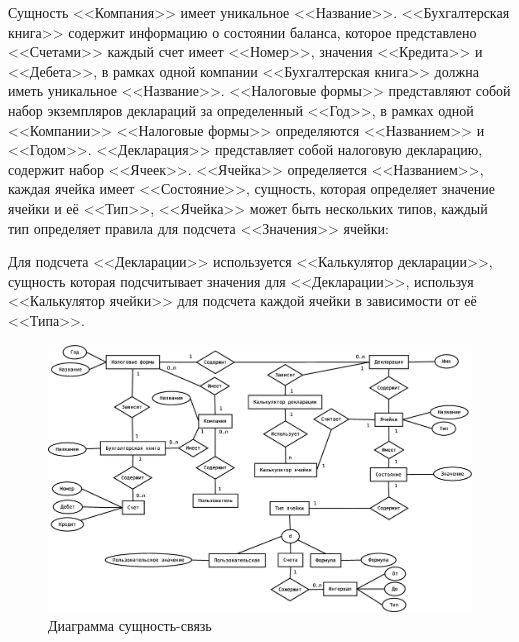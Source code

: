 \documentclass[14pt,a4paper]{reportmod}
\begin{document}
Сущность <<Компания>> имеет уникальное <<Название>>. <<Бухгалтерская книга>> содержит информацию о состоянии баланса, которое представлено <<Счетами>> каждый счет имеет <<Номер>>, значения <<Кредита>> и <<Дебета>>, в рамках одной компании <<Бухгалтерская книга>> должна иметь уникальное <<Название>>. <<Налоговые формы>> представляют собой набор экземпляров деклараций за определенный <<Год>>, в рамках одной <<Компании>> <<Налоговые формы>> определяются <<Названием>> и <<Годом>>. <<Декларация>> представляет собой налоговую декларацию, содержит набор <<Ячеек>>. <<Ячейка>> определяется <<Названием>>, каждая ячейка имеет <<Состояние>>, сущность, которая определяет значение ячейки и её <<Тип>>, <<Ячейка>> может быть нескольких типов, каждый тип определяет правила для подсчета <<Значения>> ячейки:
\begin{gostitemize}
\end{gostitemize}

Для подсчета <<Декларации>> используется <<Калькулятор декларации>>, сущность которая подсчитывает значения для <<Декларации>>, используя <<Калькулятор ячейки>> для подсчета каждой ячейки в зависимости от её <<Типа>>.

\begin{figure}
  \centering
  \includegraphics[scale=0.4]{uml/entity_pretty}
  \caption{Диаграмма сущность-связь}
  \label{pic:er_diagram}
\end{figure}
\end{document}
